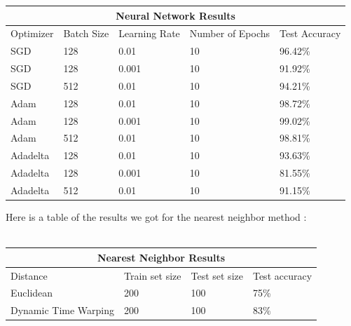 \documentclass[10pt,a4paper]{article}
\begin{document}
\begin{center}
\begin{tabular}{|p{3cm}||p{3cm}|p{3cm}|p{3cm}|p{3cm}|}
\hline
\multicolumn{5}{|c|}{Neural Network Results} \\
\hline
Optimizer & Batch Size & Learning Rate & Number of Epochs & Test Accuracy\\
\hline
SGD & 128 & 0.01 & 10 & 96.42\%\\
\hline
SGD & 128 & 0.001 & 10 & 91.92\%\\
\hline
SGD & 512 & 0.01 & 10 & 94.21\%\\
\hline
Adam & 128 & 0.01 & 10 & 98.72\%\\
\hline
Adam & 128 & 0.001 & 10 & 99.02\%\\
\hline
Adam & 512 & 0.01 & 10 & 98.81\%\\
\hline
Adadelta & 128 & 0.01 &10 & 93.63\%\\
\hline
Adadelta & 128 & 0.001 &10 & 81.55\%\\
\hline
Adadelta & 512 & 0.01 &10 & 91.15\%\\
\hline
\end{tabular}
\end{center}

Here is a table of the results we got for the nearest neighbor method :\\\\

\begin{center}
\begin{tabular}{|p{5cm}||p{3cm}|p{3cm}|p{3cm}|}
\hline
\multicolumn{4}{|c|}{Nearest Neighbor Results}\\
\hline
Distance & Train set size & Test set size & Test accuracy\\
\hline
Euclidean & 200 & 100 & 75\%\\
\hline
Dynamic Time Warping & 200 & 100 & 83\%\\
\hline
\end{tabular}
\end{center}
\end{document}
